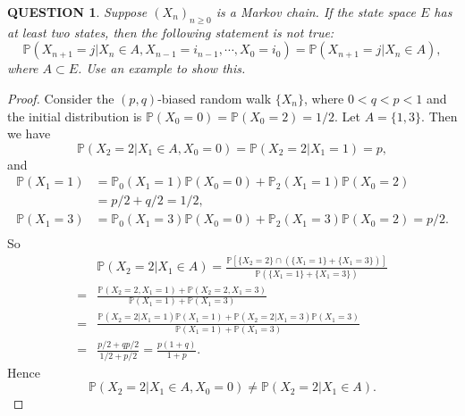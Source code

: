 \documentclass[12pt]{article}
\renewcommand{\(}{\left(}%
\renewcommand{\)}{\right)}%
\renewcommand{\[}{\left[}%
\renewcommand{\]}{\right]}%
\newcommand{\p}{\mathbb{P}}
\newtheorem{question}{QUESTION}[section]}
\newtheorem{proof}{Proof.}}
\begin{document}
  \begin{question}
   Suppose $(X_n)_{n\geq 0}$ is a Markov chain. If the state space $E$ has at least two states, then the following statement is not true:
   \begin{equation*}
    \p(X_{n+1}=j|X_n\in A,X_{n-1}=i_{n-1},\cdots,X_0=i_0 )=\p(X_{n+1}=j|X_n\in A),
   \end{equation*}
   where $A\subset E$. Use an example to show this.
  \end{question}
  \begin{proof}
   Consider the $(p,q)$-biased random walk $\{X_n\}$, where $0<q<p<1$ and the initial distribution is $\p(X_0=0)=\p(X_0=2)=1/2$. Let $A=\{1,3\}$. Then we have
   \begin{equation*}
    \p(X_2=2|X_1\in A,X_0=0)=\p(X_2=2|X_1=1)=p,
   \end{equation*}
   and
   \begin{equation*}
    \begin{split}
     \p(X_1=1)&=\p_0(X_1=1)\p(X_0=0)+\p_2(X_1=1)\p(X_0=2)\\
     &= p/2+q/2=1/2,\\
     \p(X_1=3)&=\p_0(X_1=3)\p(X_0=0)+\p_2(X_1=3)\p(X_0=2)= p/2.\\
    \end{split}
   \end{equation*}
   So
   \begin{equation*}
    \begin{split}
     &\p(X_2=2|X_1\in A)=\frac{\p\[\{X_2=2\}\cap (\{X_1=1\}+\{X_1=3\} )\]}{\p(\{X_1=1\}+\{X_1=3\} )}\\
     =&\frac{\p(X_2=2,X_1=1)+\p(X_2=2,X_1=3)}{\p(X_1=1)+\p(X_1=3)}\\
     =&\frac{\p(X_2=2|X_1=1)\p(X_1=1)+\p(X_2=2|X_1=3)\p(X_1=3)}{\p(X_1=1)+\p(X_1=3)}\\
     =&\frac{p/2+qp/2}{1/2+p/2}=\frac{p(1+q)}{1+p}.
    \end{split}
   \end{equation*}
   Hence
   \begin{equation*}
    \p(X_2=2|X_1\in A,X_0=0)\neq \p(X_2=2|X_1\in A).
   \end{equation*}
  \end{proof}
\end{document}
